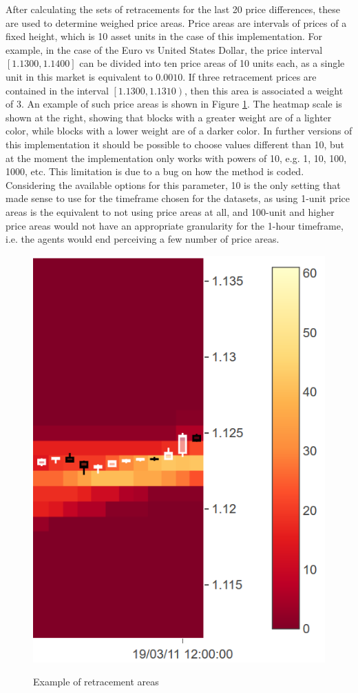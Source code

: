 After calculating the sets of retracements for the last 20 price differences,
these are used to determine weighed price areas. Price areas are intervals of
prices of a fixed height, which is 10 asset units in the case of this
implementation. For example, in the case of the Euro vs United States Dollar,
the price interval $[1.1300, 1.1400]$ can be divided into ten price areas of 10
units each, as a single unit in this market is equivalent to $0.0010$. If three
retracement prices are contained in the interval $\left[1.1300, 1.1310\right)$, then
  this area is associated a weight of $3$. An example of such price areas is
  shown in Figure \ref{figure:example-of-retracement-areas}. The heatmap scale
  is shown at the right, showing that blocks with a greater weight are of a
  lighter color, while blocks with a lower weight are of a darker color. In
  further versions of this implementation it should be possible to choose values
  different than 10, but at the moment the implementation only works with powers
  of 10, e.g. 1, 10, 100, 1000, etc. This limitation is due to a bug on how the
  method is coded. Considering the available options for this parameter, 10 is
  the only setting that made sense to use for the timeframe chosen for the
  datasets, as using 1-unit price areas is the equivalent to not using price
  areas at all, and 100-unit and higher price areas would not have an
  appropriate granularity for the 1-hour timeframe, i.e. the agents would end
  perceiving a few number of price areas.

\begin{figure}
\caption{Example of retracement areas} \centering
\includegraphics[height=0.6\textwidth]{img/retracement-areas.png}
\label{figure:example-of-retracement-areas}
\end{figure}

